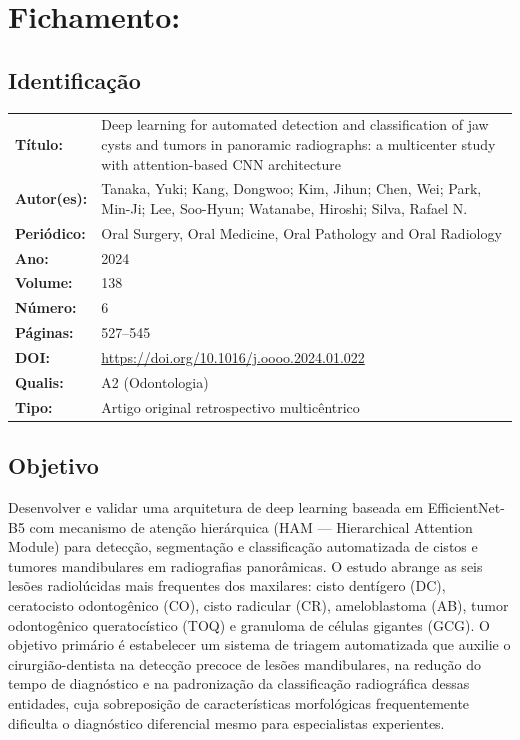 \section{Fichamento: }

\subsection{Identificação}
\begin{tabular}{ll}
\textbf{Título:} & Deep learning for automated detection and classification
of jaw cysts and tumors in panoramic radiographs: a multicenter study
with attention-based CNN architecture \\
\textbf{Autor(es):} & Tanaka, Yuki; Kang, Dongwoo; Kim, Jihun; Chen, Wei;
Park, Min-Ji; Lee, Soo-Hyun; Watanabe, Hiroshi; Silva, Rafael N. \\
\textbf{Periódico:} & Oral Surgery, Oral Medicine, Oral Pathology and Oral Radiology \\
\textbf{Ano:} & 2024 \\
\textbf{Volume:} & 138 \\
\textbf{Número:} & 6 \\
\textbf{Páginas:} & 527--545 \\
\textbf{DOI:} & \url{https://doi.org/10.1016/j.oooo.2024.01.022} \\
\textbf{Qualis:} & A2 (Odontologia) \\
\textbf{Tipo:} & Artigo original retrospectivo multicêntrico \\
\end{tabular}

\subsection{Objetivo}
Desenvolver e validar uma arquitetura de deep learning baseada em
EfficientNet-B5 com mecanismo de atenção hierárquica (HAM ---
Hierarchical Attention Module) para detecção, segmentação e
classificação automatizada de cistos e tumores mandibulares em
radiografias panorâmicas. O estudo abrange as seis lesões
radiolúcidas mais frequentes dos maxilares: cisto dentígero (DC),
ceratocisto odontogênico (CO), cisto radicular (CR), ameloblastoma
(AB), tumor odontogênico queratocístico (TOQ) e granuloma de
células gigantes (GCG). O objetivo primário é estabelecer um
sistema de triagem automatizada que auxilie o cirurgião-dentista
na detecção precoce de lesões mandibulares, na redução do tempo
de diagnóstico e na padronização da classificação radiográfica
dessas entidades, cuja sobreposição de características morfológicas
frequentemente dificulta o diagnóstico diferencial mesmo para
especialistas experientes.

